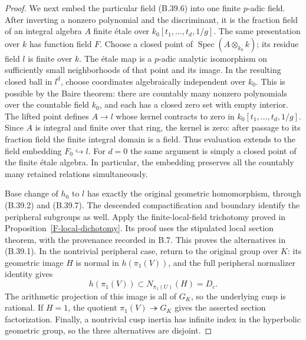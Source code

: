 \documentclass[11pt,oneside]{article}
\begin{document}
\begin{proof}
We next embed the particular field (B.39.6) into
one finite $p$-adic field. After inverting a
nonzero polynomial and the discriminant, it is
the fraction field of an integral algebra $A$
finite \'etale over
$k_0[t_1,\ldots,t_d,1/g]$. The same presentation
over $k$ has function field $F$. Choose a closed
point of $\operatorname{Spec}(A\otimes_{k_0}k)$;
its residue field $l$ is finite over $k$. The
\'etale map is a $p$-adic analytic isomorphism on
sufficiently small neighborhoods of that point
and its image. In the resulting closed ball
in $l^d$, choose coordinates algebraically
independent over $k_0$. This is possible by the
Baire theorem: there are countably many nonzero
polynomials over the countable field $k_0$, and
each has a closed zero set with empty interior.
The lifted point defines $A\to l$ whose kernel
contracts to zero in $k_0[t_1,\ldots,t_d,1/g]$.
Since $A$ is integral and finite over that ring,
the kernel is zero: after passage to its fraction
field the finite integral domain is a field.
Thus evaluation extends to the field embedding
$F_0\hookrightarrow l$. For $d=0$ the same
argument is simply a closed point of the finite
\'etale algebra. In particular, the embedding
preserves all the countably many retained
relations simultaneously.

Base change of $h_0$ to $l$ has exactly the original
geometric homomorphism, through (B.39.2) and
(B.39.7). The descended compactification and
boundary identify the peripheral subgroups as
well. Apply the finite-local-field trichotomy
proved in Proposition~\ref{F-local-dichotomy}.
Its proof uses the stipulated local section
theorem, with the provenance recorded in B.7.
This proves the alternatives in (B.39.1).
In the nontrivial peripheral case, return to
the original group over $K$: its geometric
image $H$ is normal in $h(\pi_1(V))$, and the
full peripheral normalizer identity gives
\[
 h(\pi_1(V))\subset
 N_{\pi_1(U)}(H)=D_c.
 \tag{B.39.8}
\]
The arithmetic projection of this image is all
of $G_K$, so the underlying cusp is rational.
If $H=1$, the quotient $\pi_1(V)\twoheadrightarrow
G_K$ gives the asserted section factorization.
Finally, a nontrivial cusp inertia has infinite
index in the hyperbolic geometric group, so
the three alternatives are disjoint.
\end{proof}
\end{document}

